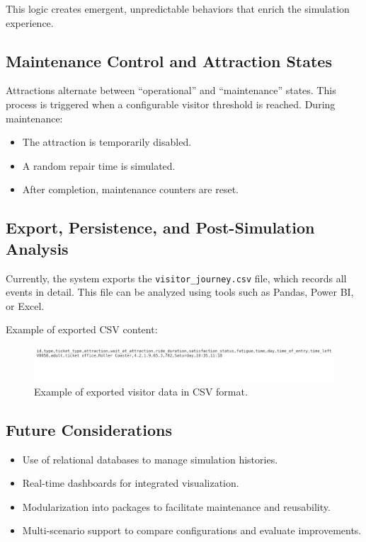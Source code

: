 \documentclass[12pt]{article}
\begin{document}
This logic creates emergent, unpredictable behaviors that enrich the simulation experience.

\subsection{Maintenance Control and Attraction States}

Attractions alternate between “operational” and “maintenance” states. This process is triggered when a configurable visitor threshold is reached. During maintenance:
\begin{itemize}
    \item The attraction is temporarily disabled.
    \item A random repair time is simulated.
    \item After completion, maintenance counters are reset.
\end{itemize}
\subsection{Export, Persistence, and Post-Simulation Analysis}

Currently, the system exports the \texttt{visitor\_journey.csv} file, which records all events in detail. This file can be analyzed using tools such as Pandas, Power BI, or Excel.

Example of exported CSV content:

\begin{figure}[H]
    \centering
    \includegraphics[width=1\textwidth]{visitor_csv_record.png}
    \caption{Example of exported visitor data in CSV format.}
    \label{fig:visitor-csv-record}
\end{figure}


\subsection{Future Considerations}

\begin{itemize}
    \item Use of relational databases to manage simulation histories.
    \item Real-time dashboards for integrated visualization.
    \item Modularization into packages to facilitate maintenance and reusability.
    \item Multi-scenario support to compare configurations and evaluate improvements.
\end{itemize}
\end{document}
